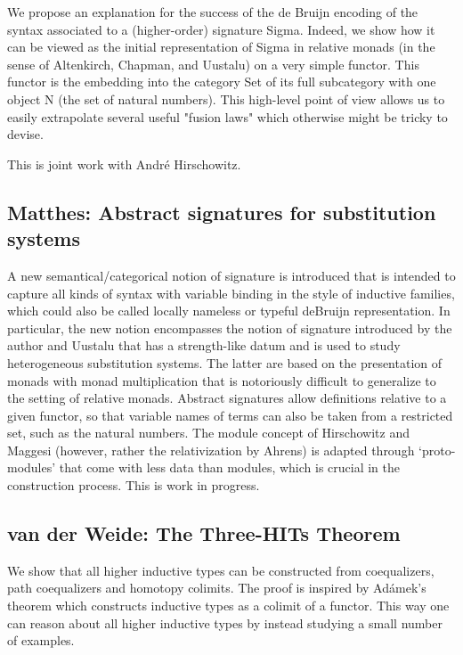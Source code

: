 \documentclass[a4paper,10pt]{scrartcl}
\begin{document}
We propose an explanation for the success of the de Bruijn encoding of the syntax associated to a (higher-order) signature Sigma. 
Indeed, we show how it can be viewed as the initial representation of Sigma in relative monads (in the sense of Altenkirch, Chapman, and Uustalu) on a very simple functor.  
This functor is the embedding into the category Set of its full subcategory with one object N (the set of natural numbers).  
This high-level point of view allows us to easily extrapolate several useful "fusion laws" which otherwise might be tricky to devise.

This is joint work with André Hirschowitz.

\subsection*{Matthes: Abstract signatures for substitution systems}

A new semantical/categorical notion of signature is introduced that is intended to capture all kinds of syntax with variable binding in the style of inductive families, 
which could also be called locally nameless or typeful deBruijn representation. 
In particular, the new notion encompasses the notion of signature introduced by the author and Uustalu that has a strength-like datum and is used to study heterogeneous substitution systems. 
The latter are based on the presentation of monads with monad multiplication that is notoriously difficult to generalize to the setting of relative monads. 
Abstract signatures allow definitions relative to a given functor, so that variable names of terms can also be taken from a restricted set, such as the natural numbers. 
The module concept of Hirschowitz and Maggesi (however, rather the relativization by Ahrens) is adapted through `proto-modules' that come with less data than modules, 
which is crucial in the construction process. This is work in progress.


\subsection*{van der Weide: The Three-HITs Theorem}

We show that all higher inductive types can be constructed from coequalizers, path coequalizers and homotopy colimits. The proof is inspired by Adámek's theorem which constructs inductive types as a colimit of a functor. This way one can reason about all higher inductive types by instead studying a small number of examples.
\end{document}
